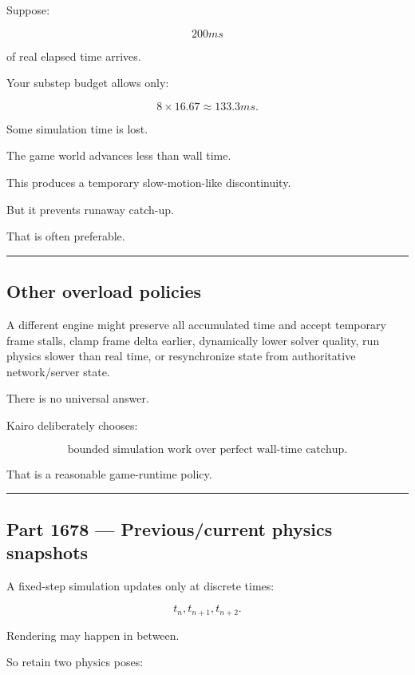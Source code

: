 Suppose:

\[
200ms
\]

of real elapsed time arrives.

Your substep budget allows only:

\[
8\times16.67
\approx133.3ms.
\]

Some simulation time is lost.

The game world advances less than wall time.

This produces a temporary slow-motion-like discontinuity.

But it prevents runaway catch-up.

That is often preferable.

\begin{center}\rule{0.5\linewidth}{0.5pt}\end{center}

\subsection{Other overload policies}\label{06-engine-ii-ch037-other-overload-policies}

A different engine might preserve all accumulated time and accept temporary frame stalls, clamp frame delta earlier, dynamically lower solver quality, run physics slower than real time, or resynchronize state from authoritative network/server state.

There is no universal answer.

Kairo deliberately chooses:

\[
\boxed{
\text{bounded simulation work over perfect wall-time catchup}.
}
\]

That is a reasonable game-runtime policy.

\begin{center}\rule{0.5\linewidth}{0.5pt}\end{center}

\subsection{Part 1678 --- Previous/current physics snapshots}\label{06-engine-ii-ch037-part-1678-previouscurrent-physics-snapshots}

A fixed-step simulation updates only at discrete times:

\[
t_n,
t_{n+1},
t_{n+2}.
\]

Rendering may happen in between.

So retain two physics poses:

